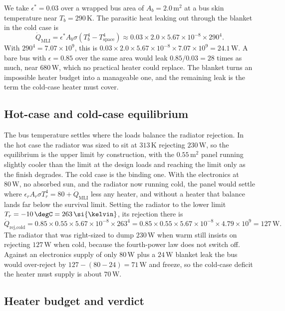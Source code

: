 
 We take $\epsilon^* =
0.03$ over a wrapped bus area of $A_b = 2.0\,\text{m}^2$ at a bus skin
temperature near $T_b = 290\,\si{\kelvin}$. The parasitic heat leaking out
through the blanket in the cold case is
\[
\dot{Q}_{\text{MLI}} = \epsilon^* A_b \sigma (T_b^4 - T_{\text{space}}^4)
\approx 0.03 \times 2.0 \times 5.67 \times 10^{-8} \times 290^4.
\]
With $290^4 = 7.07 \times 10^9$, this is $0.03 \times 2.0 \times 5.67
\times 10^{-8} \times 7.07 \times 10^9 = 24.1\,\text{W}$. A bare bus with
$\epsilon = 0.85$ over the same area would leak $0.85/0.03 = 28$ times as
much, near $680\,\text{W}$, which no practical heater could replace. The
blanket turns an impossible heater budget into a manageable one, and the
remaining leak is the term the cold-case heater must cover.

\subsection{Hot-case and cold-case equilibrium}

The bus temperature settles where the loads balance the radiator
rejection. In the hot case the radiator was sized to sit at $313\,
\si{\kelvin}$ rejecting $230\,\text{W}$, so the equilibrium is the upper
limit by construction, with the $0.55\,\text{m}^2$ panel running slightly
cooler than the limit at the design loads and reaching the limit only as
the finish degrades. The cold case is the binding one. With the
electronics at $80\,\text{W}$, no absorbed sun, and the radiator now
running cold, the panel would settle where $\epsilon_r A_r \sigma T_r^4 =
80 + \dot{Q}_{\text{MLI}}$ less any heater, and without a heater that
balance lands far below the survival limit. Setting the radiator to the
lower limit $T_r = -10\,\degC = 263\,\si{\kelvin}$, its rejection there is
\[
\dot{Q}_{\text{rej,cold}} = 0.85 \times 0.55 \times 5.67 \times 10^{-8}
\times 263^4 = 0.85 \times 0.55 \times 5.67 \times 10^{-8} \times 4.79
\times 10^9 = 127\,\text{W}.
\]
The radiator that was right-sized to dump $230\,\text{W}$ when warm still
insists on rejecting $127\,\text{W}$ when cold, because the fourth-power
law does not switch off. Against an electronics supply of only $80\,\text{W}$
plus a $24\,\text{W}$ blanket leak the bus would over-reject by $127 -
(80 - 24) = 71\,\text{W}$ and freeze, so the cold-case deficit the heater
must supply is about $70\,\text{W}$.

\subsection{Heater budget and verdict}

